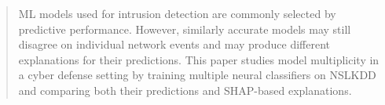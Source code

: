 \documentclass[10pt,conference]{IEEEtran}
\begin{document}
        
        
        

\begin{abstract}
\gls{ML} models used for intrusion detection are commonly selected by predictive performance. However, similarly accurate models may still disagree on individual network events and may produce different explanations for their predictions. This paper studies model multiplicity in a cyber defense setting by training multiple neural classifiers on \gls{NSLKDD} and comparing both their predictions and \gls{SHAP}-based explanations.
\end{abstract}











\end{document}

